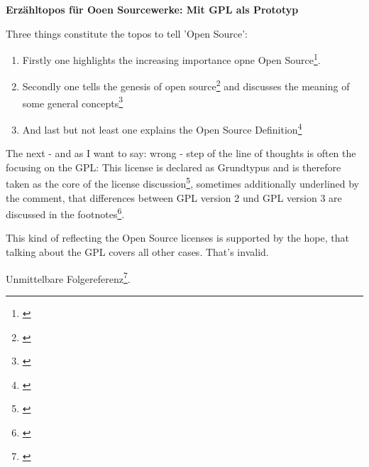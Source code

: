 %
%
%
%

%



\textbf{Erzähltopos für Ooen Sourcewerke: Mit GPL als Prototyp}

Three things constitute the topos to tell 'Open Source':
\begin{enumerate}
  \item Firstly  one highlights the increasing importance opne Open
  Source\footnote{\cite[cf.][1ff]{Oberhem2008a}}.
  \item Secondly one tells the genesis of open
  source\footnote{\cite[cf.][9]{Oberhem2008a}} and discusses the meaning of some
  general concepts\footnote{\cite[cf.][6ff and 17ff]{Oberhem2008a}}
  \item And last but not least one explains the Open Source
  Definition\footnote{\cite[cf.][10ff]{Oberhem2008a}}
\end{enumerate}

The next - and as I want to say: wrong - step of the line of thoughts is often
the focusing on the GPL: This license is declared as \glqq{}Grundtypus\grqq{}
and is therefore taken as the core of the license
discussion\footnote{\cite[cf.][33]{Oberhem2008a}}, sometimes additionally
underlined by the comment, that differences between GPL version 2 und GPL
version 3 are discussed in the footnotes\footnote{\cite[cf.][34]{Oberhem2008a}}.

This kind of reflecting the Open Source licenses is supported by the hope, that
talking about the GPL covers all other cases. That's invalid.

Unmittelbare Folgereferenz\footnote{\cite[cf.][S.2]{Oberhem2008a}}.


%
